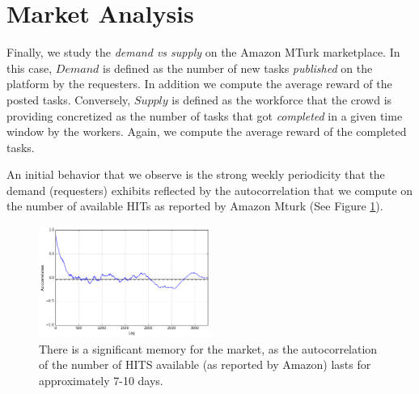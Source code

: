 \section{Market Analysis}
\label{sec:market}
Finally, we study the \emph{demand vs supply} on the Amazon MTurk marketplace.
In this case, $Demand$ is defined as the number of new tasks \emph{published} on the platform by the requesters.
In addition we compute the average reward of the posted tasks.
Conversely, $Supply$ is defined as the workforce that the crowd is providing concretized as the number of tasks that got \emph{completed} in a given time window by the workers.
Again, we compute the average reward of the completed tasks.

An initial behavior  that we observe is  the strong weekly periodicity that the demand (requesters) exhibits reflected by the autocorrelation that we compute on the number of available HITs as reported by Amazon Mturk (See Figure \ref{fig:autocorrelation1}).
\begin{figure}[ht]
	\centering
		\includegraphics[width=0.5\textwidth]{figures/autocorrelation_plot}
	\caption{There is a significant memory for the market, as the autocorrelation of the 
number of HITS available (as reported by Amazon) lasts for approximately 7-10 days.}
	\label{fig:autocorrelation1}
\end{figure}

